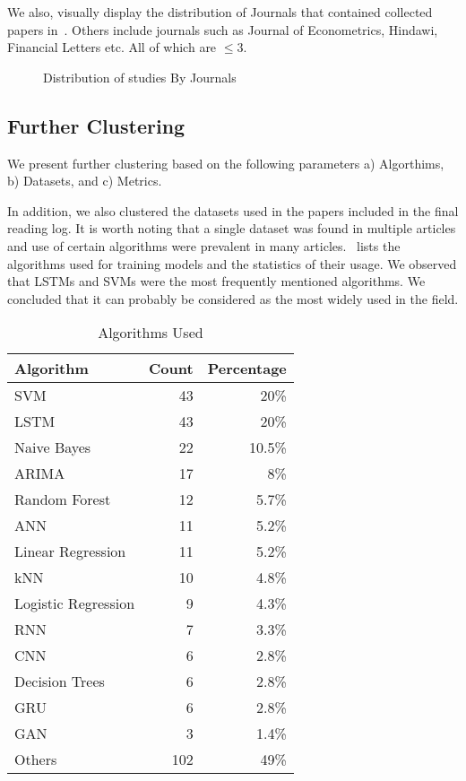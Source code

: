 \documentclass[11pt]{article}
\begin{document}
We also, visually display the distribution of Journals that contained collected papers in~. Others include journals such as Journal of Econometrics, Hindawi, Financial Letters etc. All of which are $\le 3$.

\begin{figure}
   \resizebox{\columnwidth}{!}{
    
    }
    \caption{Distribution of studies By Journals}
    \label{F:journalsdist}
\end{figure}

\subsection{Further Clustering}
We present further clustering based on the following parameters a) Algorthims, b) Datasets, and c) Metrics.

In addition, we also clustered the datasets used in the papers included in the final reading log. It is worth noting that a single dataset was found in multiple articles and use of certain algorithms were prevalent in many articles.~ lists the algorithms used for training models and the statistics of their usage. We observed that LSTMs and SVMs were the most frequently mentioned algorithms. We concluded that it can probably be considered as the most widely used in the field.


\begin{table}
\caption{Algorithms Used}
\label{T:algorithms}
\begin{tabularx}{\columnwidth}{X r r}
\toprule
Algorithm  & Count & Percentage \\
\midrule
SVM  & 43 & 20\% \\
LSTM  & 43 & 20\% \\
Naive Bayes & 22 & 10.5\% \\
ARIMA & 17 & 8\%\\
Random Forest & 12 & 5.7\% \\
ANN & 11 & 5.2\%\\
Linear Regression & 11 & 5.2\% \\
kNN & 10 & 4.8\%\\
Logistic Regression & 9 & 4.3\% \\
RNN & 7 & 3.3\% \\
CNN & 6 & 2.8\% \\
Decision Trees & 6 & 2.8\% \\
GRU & 6 & 2.8\% \\
GAN & 3 & 1.4\% \\
Others & 102 & 49\% \\


\midrule
\end{tabularx}
\end{table}
\end{document}
